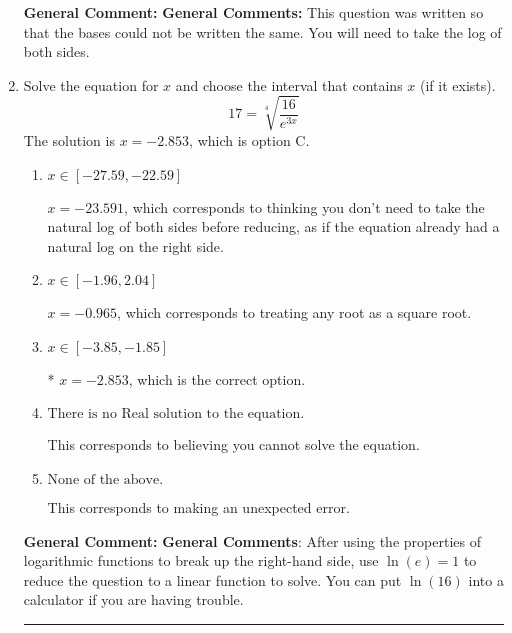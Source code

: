 \documentclass{extbook}[14pt]
\newcommand{\litem}[1]{\item #1

\rule{\textwidth}{0.4pt}}
\begin{document}
\begin{enumerate}
{\textbf{General Comment:} \textbf{General Comments:} This question was written so that the bases could not be written the same. You will need to take the log of both sides.
}
\litem{
 Solve the equation for $x$ and choose the interval that contains $x$ (if it exists).
\[  17 = \sqrt[4]{\frac{16}{e^{3x}}} \]The solution is \( x = -2.853 \), which is option C.\begin{enumerate}[label=\Alph*.]
\item \( x \in [-27.59, -22.59] \)

$x = -23.591$, which corresponds to thinking you don't need to take the natural log of both sides before reducing, as if the equation already had a natural log on the right side.
\item \( x \in [-1.96, 2.04] \)

$x = -0.965$, which corresponds to treating any root as a square root.
\item \( x \in [-3.85, -1.85] \)

* $x = -2.853$, which is the correct option.
\item \( \text{There is no Real solution to the equation.} \)

This corresponds to believing you cannot solve the equation.
\item \( \text{None of the above.} \)

This corresponds to making an unexpected error.
\end{enumerate}

\textbf{General Comment:} \textbf{General Comments}: After using the properties of logarithmic functions to break up the right-hand side, use $\ln(e) = 1$ to reduce the question to a linear function to solve. You can put $\ln(16)$ into a calculator if you are having trouble.
}
\end{enumerate}
\end{document}

